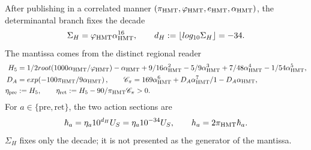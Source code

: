 \begin{theorem}
After publishing in a correlated manner
\((\pi_{\rm HMT},\varphi_{\rm HMT},e_{\rm HMT},\alpha_{\rm HMT})\), the determinantal
branch fixes the decade
\begin{equation}
 \Sigma_H=\varphi_{\rm HMT}\alpha_{\rm HMT}^{16},\qquad
 d_H:=\lfloor\log_{10}\Sigma_H\rfloor=-34.
 \label{eq:frontal-decada-accion}
\end{equation}
The mantissa comes from the distinct regional reader
\begin{align}
 H_5&=\frac12\sqrt{\frac{1000\alpha_{\rm HMT}}{\varphi_{\rm HMT}}}
 -\alpha_{\rm HMT}+\frac9{16}\alpha_{\rm HMT}^2
 -\frac59\alpha_{\rm HMT}^3+\frac7{48}\alpha_{\rm HMT}^4
 -\frac1{54}\alpha_{\rm HMT}^5,\notag\\
 D_A&=\exp\!\left(-\frac{100\pi_{\rm HMT}}9\alpha_{\rm HMT}\right),
 \qquad
 \mathscr C_\pi=169\alpha_{\rm HMT}^6+
 \frac{D_A\alpha_{\rm HMT}^7}{1-D_A\alpha_{\rm HMT}},\notag\\
 \eta_{\rm pre}&:=H_5,\qquad
 \eta_{\rm ret}:=H_5-\frac{90}{\pi_{\rm HMT}}\mathscr C_\pi>0.
 \label{eq:frontal-mantisas-accion}
\end{align}
For \(a\in\{\mathrm{pre},\mathrm{ret}\}\), the two action sections are
\begin{equation}
 \hbar_a=\eta_a10^{d_H}\mathcal U_S
 =\eta_a10^{-34}\mathcal U_S,\qquad
 h_a=2\pi_{\rm HMT}\hbar_a.
 \label{eq:frontal-secciones-accion}
\end{equation}
\(\Sigma_H\) fixes only the decade; it is not presented as the generator of the
mantissa.


\end{theorem}

